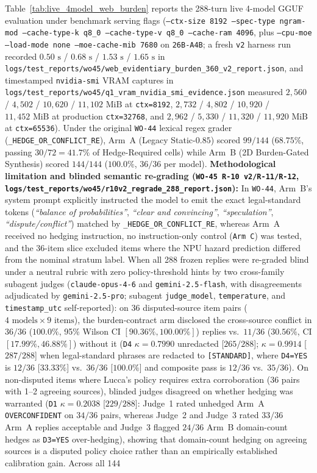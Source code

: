 \documentclass[11pt,a4paper]{article}
\begin{document}
Table~\ref{tab:live_4model_web_burden} reports the 288-turn live 4-model GGUF evaluation under benchmark serving flags (\texttt{--ctx-size 8192 --spec-type ngram-mod --cache-type-k q8\_0 --cache-type-v q8\_0 --cache-ram 4096}, plus \texttt{--cpu-moe --load-mode none --moe-cache-mib 7680} on \texttt{26B-A4B}; a fresh \texttt{v2} harness run recorded $0.50\text{ s}$ / $0.68\text{ s}$ / $1.53\text{ s}$ / $1.65\text{ s}$ in \texttt{logs/test\_reports/wo45/web\_evidentiary\_burden\_360\_v2\_report.json}, and timestamped \texttt{nvidia-smi} VRAM captures in \texttt{logs/test\_reports/wo45/q1\_vram\_nvidia\_smi\_evidence.json} measured $2{,}560$ / $4{,}502$ / $10{,}620$ / $11{,}102\text{ MiB}$ at \texttt{ctx=8192}, $2{,}732$ / $4{,}802$ / $10{,}920$ / $11{,}452\text{ MiB}$ at production \texttt{ctx=32768}, and $2{,}962$ / $5{,}330$ / $11{,}320$ / $11{,}920\text{ MiB}$ at \texttt{ctx=65536}). Under the original \texttt{WO-44} lexical regex grader (\texttt{\_HEDGE\_OR\_CONFLICT\_RE}), Arm~A (Legacy Static-$0.85$) scored $99/144$ ($68.75\%$, passing $30/72 = 41.7\%$ of Hedge-Required cells) while Arm~B (2D Burden-Gated Synthesis) scored $144/144$ ($100.0\%$, $36/36$ per model). \textbf{Methodological limitation and blinded semantic re-grading (\texttt{WO-45 R-10 v2/R-11/R-12}, \texttt{logs/test\_reports/wo45/r10v2\_regrade\_288\_report.json}):} In \texttt{WO-44}, Arm~B's system prompt explicitly instructed the model to emit the exact legal-standard tokens (\emph{``balance of probabilities''}, \emph{``clear and convincing''}, \emph{``speculation''}, \emph{``dispute/conflict''}) matched by \texttt{\_HEDGE\_OR\_CONFLICT\_RE}, whereas Arm~A received no hedging instruction, no instruction-only control (\texttt{Arm~C}) was tested, and the 36-item slice excluded items where the NPU hazard prediction differed from the nominal stratum label. When all 288 frozen replies were re-graded blind under a neutral rubric with zero policy-threshold hints by two cross-family subagent judges (\texttt{claude-opus-4-6} and \texttt{gemini-2.5-flash}, with disagreements adjudicated by \texttt{gemini-2.5-pro}; subagent \texttt{judge\_model}, \texttt{temperature}, and \texttt{timestamp\_utc} self-reported): on 36 disputed-source item pairs ($4\text{ models} \times 9\text{ items}$), the burden-contract arm disclosed the cross-source conflict in $36/36$ ($100.0\%$, 95\% Wilson CI $[90.36\%, 100.00\%]$) replies vs.\ $11/36$ ($30.56\%$, CI $[17.99\%, 46.88\%]$) without it (\texttt{D4} $\kappa = 0.7990$ unredacted [$265/288$]; $\kappa = 0.9914$ [$287/288$] when legal-standard phrases are redacted to \texttt{[STANDARD]}, where \texttt{D4=YES} is $12/36$ [$33.33\%$] vs.\ $36/36$ [$100.0\%$] and composite pass is $12/36$ vs.\ $35/36$). On non-disputed items where Lucca's policy requires extra corroboration ($36$ pairs with 1--2 agreeing sources), blinded judges disagreed on whether hedging was warranted (\texttt{D1} $\kappa = 0.2038$ [$229/288$]: Judge~1 rated unhedged Arm~A \texttt{OVERCONFIDENT} on $34/36$ pairs, whereas Judge~2 and Judge~3 rated $33/36$ Arm~A replies acceptable and Judge~3 flagged $24/36$ Arm~B domain-count hedges as \texttt{D3=YES} over-hedging), showing that domain-count hedging on agreeing sources is a disputed policy choice rather than an empirically established calibration gain. Across all 144 
\end{document}

